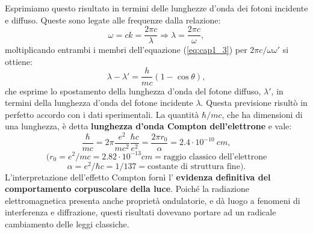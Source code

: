 Esprimiamo questo risultato in termini delle lunghezze d'onda dei fotoni incidente e diffuso. Queste sono legate alle frequenze dalla relazione:
\begin{equation}
\omega = c k =\frac{2 \pi c}{\lambda} \Rightarrow \lambda =\frac{2 \pi c}{\omega},
\end{equation}
moltiplicando entrambi i membri dell'equazione (\ref{eq:cap1_3}) per $2 \pi c / \omega \omega '$ si ottiene:
\begin{equation}
\lambda - \lambda ' =\frac{h}{mc}\left( 1-\cos \theta \right),
\end{equation}
che esprime lo spostamento della lunghezza d'onda del fotone diffuso, $\lambda ' $, in termini della lunghezza d'onda del fotone incidente $\lambda$. Questa previsione risultò in perfetto accordo con i dati sperimentali.
La quantità $\hbar/ mc$, che ha dimensioni di una lunghezza, è detta \textbf{lunghezza d'onda Compton dell'elettrone} e vale:
\[
\frac{\hbar}{mc}= 2\pi \frac{e^2}{mc^2}\frac{\hbar c}{e^2}= \frac{2\pi r_0}{\alpha}= 2.4 \cdot 10^{-10} \ cm,
\]
\[(r_0 = e^2/mc = 2.82 \cdot 10^{-13} cm = \textrm{raggio classico dell'elettrone}\]
\[\alpha = e^2/\hbar c = 1/137 = \textrm{costante di struttura fine}).\]
L'interpretazione dell'effetto Compton fornì l' \textbf{evidenza definitiva del comportamento corpuscolare della luce}. Poiché la radiazione elettromagnetica presenta anche proprietà ondulatorie, e dà luogo a fenomeni di interferenza e diffrazione, questi risultati dovevano portare ad un radicale cambiamento delle leggi classiche.
